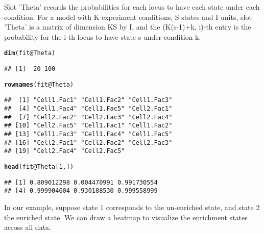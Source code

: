 \documentclass[a4paper,10pt]{article}\usepackage[]{graphicx}\usepackage[]{color}
\makeatletter
\newcommand{\hlnum}[1]{\textcolor[rgb]{0.686,0.059,0.569}{#1}}%
\newcommand{\hlopt}[1]{\textcolor[rgb]{0,0,0}{#1}}%
\newcommand{\hlstd}[1]{\textcolor[rgb]{0.345,0.345,0.345}{#1}}%
\newcommand{\hlkwc}[1]{\textcolor[rgb]{0.333,0.667,0.333}{#1}}%
\newcommand{\hlkwd}[1]{\textcolor[rgb]{0.737,0.353,0.396}{\textbf{#1}}}%
\newenvironment{kframe}{%
 \def\at@end@of@kframe{}%
 \ifinner\ifhmode%
  \def\at@end@of@kframe{\end{minipage}}%
  \begin{minipage}{\columnwidth}%
 \fi\fi%
 \def\FrameCommand##1{\hskip\@totalleftmargin \hskip-\fboxsep
 \colorbox{shadecolor}{##1}\hskip-\fboxsep
     \hskip-\linewidth \hskip-\@totalleftmargin \hskip\columnwidth}%
 \MakeFramed {\advance\hsize-\width
   \@totalleftmargin\z@ \linewidth\hsize
   \@setminipage}}%
 {\par\unskip\endMakeFramed%
 \at@end@of@kframe}
\newenvironment{knitrout}{}{} %
\makeatother
\begin{document}
Slot 'Theta' records the probabilities for each locus to have each state under each condition. For a model with K experiment conditions, S states and I units, slot 'Theta' is a matrix of dimension KS by I, and the (K(s-1)+k, i)-th entry is the probability for the i-th locus to have state s under condition k. 

\begin{knitrout}
\color{fgcolor}\begin{kframe}
\begin{alltt}
\hlkwd{dim}\hlstd{(fit}\hlopt{@}\hlkwc{Theta}\hlstd{)}
\end{alltt}
\begin{verbatim}
## [1]  20 100
\end{verbatim}
\begin{alltt}
\hlkwd{rownames}\hlstd{(fit}\hlopt{@}\hlkwc{Theta}\hlstd{)}
\end{alltt}
\begin{verbatim}
##  [1] "Cell1.Fac1" "Cell1.Fac2" "Cell1.Fac3"
##  [4] "Cell1.Fac4" "Cell1.Fac5" "Cell2.Fac1"
##  [7] "Cell2.Fac2" "Cell2.Fac3" "Cell2.Fac4"
## [10] "Cell2.Fac5" "Cell1.Fac1" "Cell1.Fac2"
## [13] "Cell1.Fac3" "Cell1.Fac4" "Cell1.Fac5"
## [16] "Cell2.Fac1" "Cell2.Fac2" "Cell2.Fac3"
## [19] "Cell2.Fac4" "Cell2.Fac5"
\end{verbatim}
\begin{alltt}
\hlkwd{head}\hlstd{(fit}\hlopt{@}\hlkwc{Theta}\hlstd{[}\hlnum{1}\hlstd{, ])}
\end{alltt}
\begin{verbatim}
## [1] 0.809012298 0.004470991 0.991730554
## [4] 0.999904604 0.930188530 0.999558999
\end{verbatim}
\end{kframe}
\end{knitrout}

In our example, suppose state 1 corresponds to the un-enriched state, and state 2 the enriched state. We can draw a heatmap to visualize the enrichment states across all data.
\end{document}
